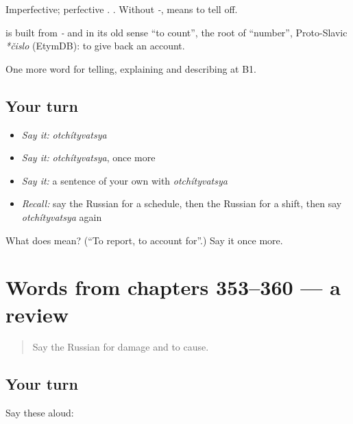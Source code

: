 Imperfective; perfective \emph{}. \emph{    }. Without \emph{-}, \emph{} means to tell off.

\begin{cousinweb}
\textbf{} is built from \emph{-} and \emph{} in its old sense \textquotedblleft{}to count\textquotedblright{}, the root of \emph{} \textquotedblleft{}number\textquotedblright{}, Proto-Slavic \emph{*čislo} (EtymDB): to give back an account.
\end{cousinweb}

\begin{grammarlens}[title={What you've built}]
One more word for telling, explaining and describing at B1.
\end{grammarlens}

\subsection*{Your turn}
\begin{itemize}
\raggedright
  \item \emph{Say it:} \emph{otchítyvatsya}
  \item \emph{Say it:} \emph{otchítyvatsya}, once more
  \item \emph{Say it:} a sentence of your own with \emph{otchítyvatsya}
  \item \emph{Recall:} say the Russian for a schedule, then the Russian for a shift, then say \emph{otchítyvatsya} again
\end{itemize}

\begin{tcolorbox}[breakable,colback=teal!4,colframe=teal!35!black,title={Before you move on}]
What does  mean? (\textquotedblleft{}To report, to account for\textquotedblright{}.) Say it once more.
\end{tcolorbox}
\section[(dialogue)]{Words from chapters 353–360 — a review}

\label{lesson:RU-R360-review-353-360}



\begin{quote}
Say the Russian for damage and to cause.
\end{quote}

\subsection*{Your turn}
Say these aloud:

